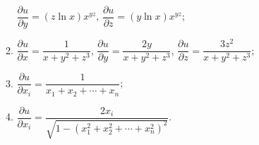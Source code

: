 \begin{enumerate}
\begin{enumerate}[(1)]
                $\dfrac{\partial{u}}{\partial{y}} = (z\ln{x})x^{yz}$,
                $\dfrac{\partial{u}}{\partial{z}} = (y\ln{x})x^{yz}$;
            \item %
                $\dfrac{\partial{u}}{\partial{x}} = \dfrac{1}{x+y^2+z^3}$,
                $\dfrac{\partial{u}}{\partial{y}} = \dfrac{2y}{x+y^2+z^3}$,
                $\dfrac{\partial{u}}{\partial{z}} = \dfrac{3z^2}{x+y^2+z^3}$;
            \item %
                $\dfrac{\partial{u}}{\partial{x_i}} = \dfrac{1}{x_1 + x_2 + \cdots + x_n}$;
            \item %
                $\dfrac{\partial{u}}{\partial{x_i}} = \dfrac{2x_i}{\sqrt{1 - (x_1^2 + x_2^2 + \cdots + x_n^2)^2}}$.
        \end{enumerate}
\end{enumerate}
% 